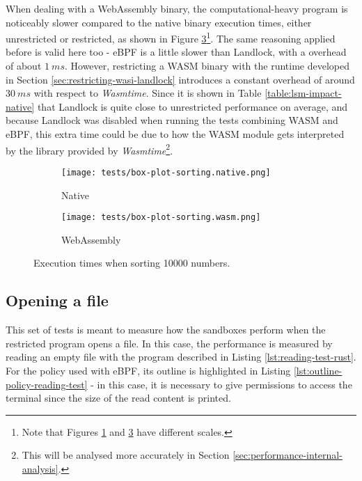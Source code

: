 When dealing with a WebAssembly binary, the computational-heavy program is noticeably slower
compared to the native binary execution times, either unrestricted or restricted, as shown in Figure
\ref{fig:distribution-sorting-wasm}\footnote{Note that Figures \ref{fig:distribution-sorting-native} and \ref{fig:distribution-sorting-wasm}
have different scales.}.
The same reasoning applied before is valid here too - eBPF is a little slower than Landlock, with a overhead
of about $1\ ms$.
However, restricting a WASM binary with the runtime developed in Section \ref{sec:restricting-wasi-landlock}
introduces a constant overhead of around $30\ ms$ with respect to \textit{Wasmtime}.
Since it is shown in Table \ref{table:lsm-impact-native} that Landlock is quite close to
unrestricted performance on average, and because Landlock was disabled when running
the tests combining WASM and eBPF, this extra time could be due to how the WASM module gets
interpreted by the library provided by \textit{Wasmtime}\footnote{This will be analysed more
accurately in Section \ref{sec:performance-internal-analysis}.}.

\begin{figure}[ht]
  \centering
  \begin{subfigure}[b]{0.49\textwidth}
    \centering
    \texttt{[image: tests/box-plot-sorting.native.png]}
    \caption{Native}
    \label{fig:distribution-sorting-native}
  \end{subfigure}
  \begin{subfigure}[b]{0.49\linewidth}
    \centering
    \texttt{[image: tests/box-plot-sorting.wasm.png]}
    \caption{WebAssembly}
    \label{fig:distribution-sorting-wasm}
  \end{subfigure}
  \caption{Execution times when sorting 10000 numbers.}
\end{figure}

\clearpage

\subsection{Opening a file}

This set of tests is meant to measure how the sandboxes perform when the restricted program opens a file.
In this case, the performance is measured by reading an empty file with the program described in Listing \ref{lst:reading-test-rust}.
For the policy used with eBPF, its outline is highlighted in Listing \ref{lst:outline-policy-reading-test}
- in this case, it is necessary to give permissions to access the terminal since the size of the read content is printed. 

